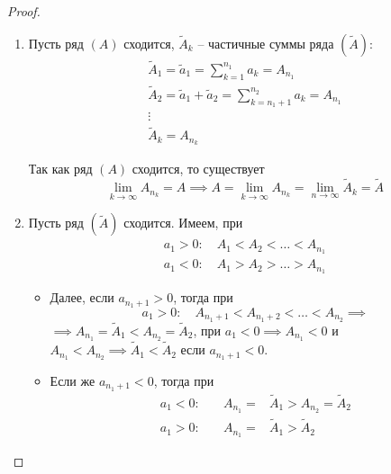 \documentclass{report}
\theoremstyle{definition}
\begin{document}
\begin{proof}
  \begin{enumerate}
    \item Пусть ряд $(A)$ сходится, $\widetilde{A}_k$ -- частичные суммы ряда $(\widetilde{A})$:
          \begin{equation*}
            \begin{array}{l}
              \widetilde{A}_1 = \widetilde{a}_1 = \sum_{k=1}^{n_1}a_k = A_{n_1}                         \\
              \widetilde{A}_2 = \widetilde{a}_1 + \widetilde{a}_2 = \sum_{k=n_1 + 1}^{n_2}a_k = A_{n_1} \\
              \vdots                                                                                    \\
              \widetilde{A}_k = A_{n_k}
            \end{array}
          \end{equation*}

          Так как ряд $(A)$ сходится, то существует
          \begin{equation*}
            \underset{k\rightarrow\infty}{\lim}A_{n_k} = A \implies A = \underset{k\rightarrow\infty}{\lim}A_{n_k} = \underset{n\rightarrow\infty}{\lim}\widetilde{A}_k = \widetilde{A}
          \end{equation*}

    \item Пусть ряд $(\widetilde{A})$ сходится. Имеем, при
          \begin{eqnarray*}
            a_1 > 0: \quad A_1 < A_2 < \ldots < A_{n_1} \\
            a_1 < 0: \quad A_1 > A_2 > \ldots > A_{n_1}
          \end{eqnarray*}

          \begin{itemize}
            \item Далее, если $a_{n_1 + 1} > 0$, тогда при
                  \begin{equation*}
                    a_1 > 0: \quad A_{n_1 + 1} < A_{n_1 + 2} < \ldots < A_{n_2} \implies
                  \end{equation*}
                  $\implies A_{n_1} = \widetilde{A}_1 < A_{n_2} = \widetilde{A}_2$, при $a_1 < 0 \implies A_{n_1} < 0$ и $A_{n_1} < A_{n_2} \implies \widetilde{A}_1 < \widetilde{A}_2$ если $a_{n_1 + 1} < 0$.

            \item Если же $a_{n_1 + 1} < 0$, тогда при
                  \begin{eqnarray*}
                    a_1 < 0: & \quad A_{n_1} = & \widetilde{A}_1 > A_{n_2} = \widetilde{A}_2 \\
                    a_1 > 0: & \quad A_{n_1} = & \widetilde{A}_1 > \widetilde{A}_2
                  \end{eqnarray*}
          \end{itemize}


\end{enumerate}
\end{proof}
\end{document}
